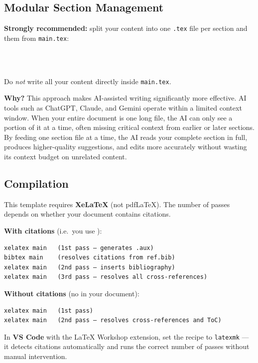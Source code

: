 \subsection{Modular Section Management}

\textbf{Strongly recommended:} split your content into one \texttt{.tex} file
per section and \verb|| them from \texttt{main.tex}:

\begin{verbatim}



\end{verbatim}

Do \emph{not} write all your content directly inside \texttt{main.tex}.

\textbf{Why?} This approach makes AI-assisted writing significantly more
effective.
AI tools such as ChatGPT, Claude, and Gemini operate within a limited
context window.
When your entire document is one long file, the AI can only see a portion of
it at a time, often missing critical context from earlier or later sections.
By feeding one section file at a time, the AI reads your complete section in
full, produces higher-quality suggestions, and edits more accurately without
wasting its context budget on unrelated content.

\subsection{Compilation}

This template requires \textbf{XeLaTeX} (not pdfLaTeX).
The number of passes depends on whether your document contains citations.

\textbf{With citations} (i.e.\ you use \verb||):

\begin{verbatim}
xelatex main   (1st pass — generates .aux)
bibtex main    (resolves citations from ref.bib)
xelatex main   (2nd pass — inserts bibliography)
xelatex main   (3rd pass — resolves all cross-references)
\end{verbatim}

\textbf{Without citations} (no \verb|| in your document):

\begin{verbatim}
xelatex main   (1st pass)
xelatex main   (2nd pass — resolves cross-references and ToC)
\end{verbatim}

In \textbf{VS Code} with the LaTeX Workshop extension, set the recipe to
\texttt{latexmk} — it detects citations automatically and runs the correct
number of passes without manual intervention.
